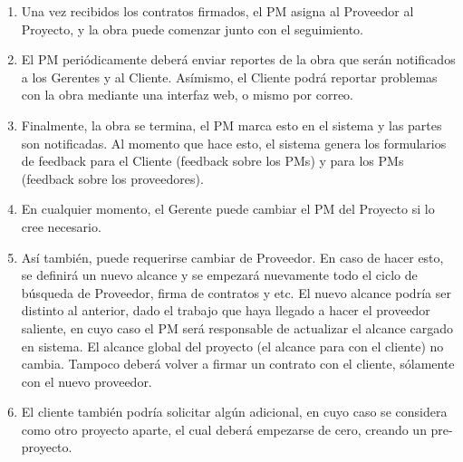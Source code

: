 \begin{enumerate}
    \item Una vez recibidos los contratos firmados, el PM asigna al Proveedor al 
    Proyecto, y la obra puede comenzar junto con el seguimiento. 
    
    \item El PM periódicamente deberá enviar reportes de la obra que serán notificados 
    a los Gerentes y al Cliente. Asímismo, el Cliente podrá reportar problemas 
    con la obra mediante una interfaz web, o mismo por correo. 
    
    \item Finalmente, la obra se termina, el PM marca esto en el sistema y las partes 
    son notificadas. Al momento que hace esto, el sistema genera los formularios 
    de feedback para el Cliente (feedback sobre los PMs) y para los PMs (feedback sobre 
    los proveedores). 
    
    \item En cualquier momento, el Gerente puede cambiar el PM del Proyecto si 
    lo cree necesario. 
    
    \item Así también, puede requerirse cambiar de Proveedor. En caso de hacer 
    esto, se definirá un nuevo alcance y se empezará nuevamente todo el ciclo 
    de búsqueda de Proveedor, firma de contratos y etc. El nuevo alcance 
    podría ser distinto al anterior, dado el trabajo que haya llegado a 
    hacer el proveedor saliente, en cuyo caso el PM será responsable de actualizar 
    el alcance cargado en sistema. El alcance global del proyecto (el alcance para 
    con el cliente) no cambia. Tampoco deberá volver a firmar un contrato con el cliente, 
    sólamente con el nuevo proveedor. 
    
    \item El cliente también podría solicitar algún adicional, en cuyo caso se considera 
    como otro proyecto aparte, el cual deberá empezarse de cero, creando un pre-proyecto. 
    
\end{enumerate}
